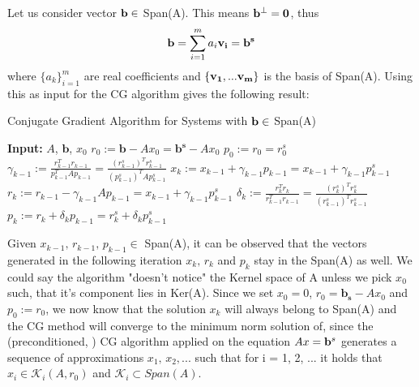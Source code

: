 Let us consider vector \(\bold{b} \in\) Span(A). This means \(\bold{b^{\perp} = 0}\), thus 
\begin{equation}   
\bold{b} = \sum_{i=1}^m{a_i \bold{v_i}} = \bold{b^s}
\end{equation} 
where \(\{a_k\}_{i=1}^m\) are real coefficients and \(\bold{\{v_1,...v_m\}}\) is the basis of Span(A).
Using this as input for the CG algorithm gives the following result:
\begin{algorithm}
\caption{Conjugate Gradient Algorithm for Systems with \(\bold{b} \in\) Span(A)}
\begin{algorithmic}[1]
    \STATE \textbf{Input:} $A$, $\boldsymbol{b}$, $x_0$
    \STATE $r_0 := \boldsymbol{b} - Ax_0 = \boldsymbol{b^s} - Ax_0$
    \STATE $p_0 := r_0 = r_0^s$
        \STATE $\gamma_{k-1} := \frac{r_{k-1}^T r_{k-1}}{p_{k-1}^T A p_{k-1}} =  \frac{(r_{k-1}^s)^T r_{k-1}^s}{(p_{k-1}^s)^T A p_{k-1}^s}$
        \STATE $x_k := x_{k-1} + \gamma_{k-1} p_{k-1} = x_{k-1} + \gamma_{k-1} p_{k-1}^s$
        \STATE $r_k := r_{k-1} - \gamma_{k-1} A p_{k-1} = x_{k-1} + \gamma_{k-1} p_{k-1}^s$
        \STATE $\delta_k := \frac{r_k^T r_k}{r_{k-1}^T r_{k-1}} = \frac{(r_k^s)^T r_k^s}{(r_{k-1}^s)^T r_{k-1}^s}$
        \STATE $p_k := r_k + \delta_k p_{k-1} = r_k^s + \delta_k p_{k-1}^s$
    \ENDFOR
\end{algorithmic}
\end{algorithm}



    Given \(x_{k-1},\,r_{k-1},\,p_{k-1} \in\) Span(A), it can be observed that the vectors generated in the following iteration \( x_k,\,r_k \) and \(p_k \) stay in the Span(A) as well. We could say the algorithm "doesn't notice" the Kernel space of A unless we pick \(x_0\) such, that it's component lies in Ker(A). Since we set \(x_0 = 0\), \(r_0 = \boldsymbol{b_s} - Ax_0\) and \(p_0 := r_0\), we now know that the solution \(x_k\) will always belong to Span(A) and the CG method will converge to the minimum norm solution of, since the (preconditioned, \cite{Kaasschieter}) CG algorithm applied on the equation \(Ax = \bold{b}^s\) generates a sequence of approximations \(x_1,\, x_2,... \) such that for i = 1, 2, ... it holds that \(x_i \in \mathcal{K}_i(A,r_0)\) and \(\mathcal{K}_i \subset Span(A)\).


